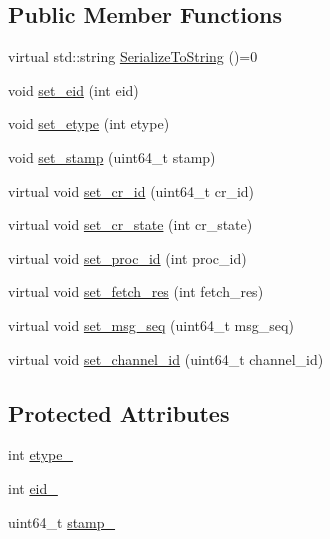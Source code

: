 \subsection*{Public Member Functions}
\begin{DoxyCompactItemize}
\item 
virtual std\-::string \hyperlink{classapollo_1_1cyber_1_1event_1_1EventBase_a76173ad9c315ed775371469d612b489d}{Serialize\-To\-String} ()=0
\item 
void \hyperlink{classapollo_1_1cyber_1_1event_1_1EventBase_ad7322836ed1d5d2a1a1c5bbf88f04df0}{set\-\_\-eid} (int eid)
\item 
void \hyperlink{classapollo_1_1cyber_1_1event_1_1EventBase_aae9bb6e39842338f1139c6496d71dfb6}{set\-\_\-etype} (int etype)
\item 
void \hyperlink{classapollo_1_1cyber_1_1event_1_1EventBase_a3b0ef301b6eb0bd03c0c98e4c85ae29e}{set\-\_\-stamp} (uint64\-\_\-t stamp)
\item 
virtual void \hyperlink{classapollo_1_1cyber_1_1event_1_1EventBase_adca308f7a8828fc85f7a7c47f8e62938}{set\-\_\-cr\-\_\-id} (uint64\-\_\-t cr\-\_\-id)
\item 
virtual void \hyperlink{classapollo_1_1cyber_1_1event_1_1EventBase_a9b0dbb9c9db334795fb32523be945e20}{set\-\_\-cr\-\_\-state} (int cr\-\_\-state)
\item 
virtual void \hyperlink{classapollo_1_1cyber_1_1event_1_1EventBase_a892ea37f81adc4981bc91396919c4e9a}{set\-\_\-proc\-\_\-id} (int proc\-\_\-id)
\item 
virtual void \hyperlink{classapollo_1_1cyber_1_1event_1_1EventBase_a3023ba9bdcd8996d879099ac19647465}{set\-\_\-fetch\-\_\-res} (int fetch\-\_\-res)
\item 
virtual void \hyperlink{classapollo_1_1cyber_1_1event_1_1EventBase_ae70276f235359287b75a72b932903bf1}{set\-\_\-msg\-\_\-seq} (uint64\-\_\-t msg\-\_\-seq)
\item 
virtual void \hyperlink{classapollo_1_1cyber_1_1event_1_1EventBase_af2db22e91dcce677a59ecab489685542}{set\-\_\-channel\-\_\-id} (uint64\-\_\-t channel\-\_\-id)
\end{DoxyCompactItemize}
\subsection*{Protected Attributes}
\begin{DoxyCompactItemize}
\item 
int \hyperlink{classapollo_1_1cyber_1_1event_1_1EventBase_ae26baa01961de359956540b4e5f98ad5}{etype\-\_\-}
\item 
int \hyperlink{classapollo_1_1cyber_1_1event_1_1EventBase_a1d9e13642a28e712a16bff0224e0b6fe}{eid\-\_\-}
\item 
uint64\-\_\-t \hyperlink{classapollo_1_1cyber_1_1event_1_1EventBase_afaeda733409e3addc6e7f839b694333d}{stamp\-\_\-}
\end{DoxyCompactItemize}


